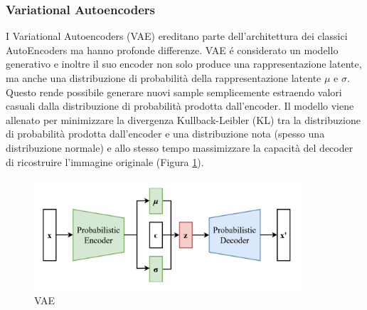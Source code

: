 \subsubsection{Variational Autoencoders}
I Variational Autoencoders (VAE) ereditano parte dell'architettura dei classici AutoEncoders ma hanno profonde differenze. VAE é considerato un modello generativo e inoltre il suo encoder non solo produce una rappresentazione latente, ma anche una distribuzione di probabilità della rappresentazione latente $\mu$ e $\sigma$. Questo rende possibile generare nuovi sample semplicemente estraendo valori casuali dalla distribuzione di probabilità prodotta dall'encoder.
Il modello viene allenato per minimizzare la divergenza Kullback-Leibler (KL) tra la distribuzione di probabilità prodotta dall'encoder e una distribuzione nota (spesso una distribuzione normale) e allo stesso tempo massimizzare la capacità del decoder di ricostruire l'immagine originale (Figura \ref{vae}).
\begin{figure}[t]
	\centering
	\includegraphics[width=10cm, scale=1]{images/vae}
	\caption{VAE}
	\label{vae}
\end{figure}

